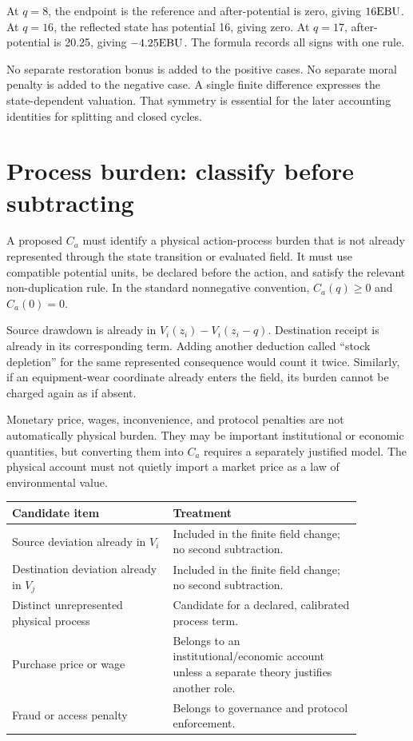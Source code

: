 At \(q=8\), the endpoint is the reference and after-potential is zero, giving \(16\mathrm{EBU}\). At \(q=16\), the reflected state has potential 16, giving zero. At \(q=17\), after-potential is 20.25, giving \(-4.25\mathrm{EBU}\). The formula records all signs with one rule.

No separate restoration bonus is added to the positive cases. No separate moral penalty is added to the negative case. A single finite difference expresses the state-dependent valuation. That symmetry is essential for the later accounting identities for splitting and closed cycles.

\section{Process burden: classify before subtracting}
A proposed \(C_a\) must identify a physical action-process burden that is not already represented through the state transition or evaluated field. It must use compatible potential units, be declared before the action, and satisfy the relevant non-duplication rule. In the standard nonnegative convention, \(C_a(q)\geq0\) and \(C_a(0)=0\).

Source drawdown is already in \(V_i(z_i)-V_i(z_i-q)\). Destination receipt is already in its corresponding term. Adding another deduction called ``stock depletion'' for the same represented consequence would count it twice. Similarly, if an equipment-wear coordinate already enters the field, its burden cannot be charged again as if absent.

Monetary price, wages, inconvenience, and protocol penalties are not automatically physical burden. They may be important institutional or economic quantities, but converting them into \(C_a\) requires a separately justified model. The physical account must not quietly import a market price as a law of environmental value.

\begin{center}
\begin{tabular}{P{0.40\linewidth}P{0.47\linewidth}}
\toprule
Candidate item & Treatment\\
\midrule
Source deviation already in \(V_i\) & Included in the finite field change; no second subtraction.\\
Destination deviation already in \(V_j\) & Included in the finite field change; no second subtraction.\\
Distinct unrepresented physical process & Candidate for a declared, calibrated process term.\\
Purchase price or wage & Belongs to an institutional/economic account unless a separate theory justifies another role.\\
Fraud or access penalty & Belongs to governance and protocol enforcement.\\
\bottomrule
\end{tabular}
\end{center}

